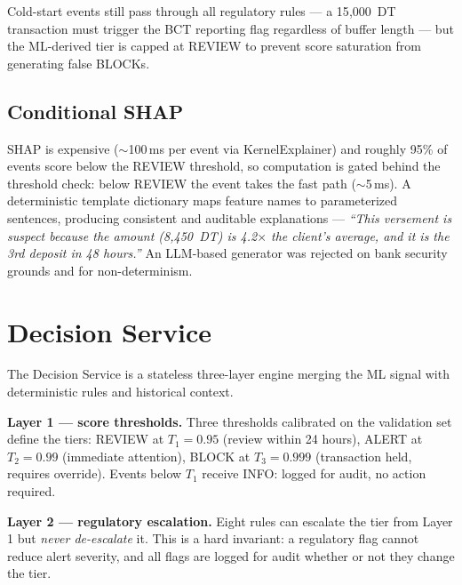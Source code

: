 Cold-start events still pass through all regulatory rules --- a 15{,}000~DT transaction must trigger the BCT reporting flag regardless of buffer length --- but the ML-derived tier is capped at REVIEW to prevent score saturation from generating false BLOCKs.

\subsection{Conditional SHAP}

SHAP is expensive ($\sim$100\,ms per event via KernelExplainer) and roughly 95\% of events score below the REVIEW threshold, so computation is gated behind the threshold check: below REVIEW the event takes the fast path ($\sim$5\,ms). A deterministic template dictionary maps feature names to parameterized sentences, producing consistent and auditable explanations --- \emph{``This versement is suspect because the amount (8{,}450~DT) is 4.2$\times$ the client's average, and it is the 3rd deposit in 48 hours.''} An LLM-based generator was rejected on bank security grounds and for non-determinism.

\section{Decision Service}

The Decision Service is a stateless three-layer engine merging the ML signal with deterministic rules and historical context.

\textbf{Layer 1 --- score thresholds.} Three thresholds calibrated on the validation set define the tiers: REVIEW at $T_1 = 0.95$ (review within 24 hours), ALERT at $T_2 = 0.99$ (immediate attention), BLOCK at $T_3 = 0.999$ (transaction held, requires override). Events below $T_1$ receive INFO: logged for audit, no action required.

\textbf{Layer 2 --- regulatory escalation.} Eight rules can escalate the tier from Layer 1 but \emph{never de-escalate} it. This is a hard invariant: a regulatory flag cannot reduce alert severity, and all flags are logged for audit whether or not they change the tier.

